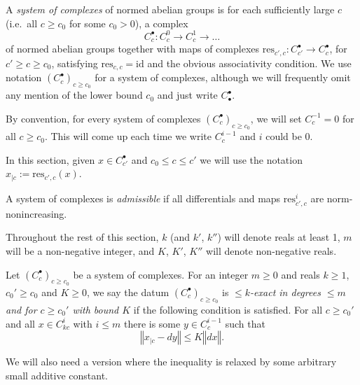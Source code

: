 \begin{definition}
  \label{system_of_complexes}
  \leanok
  A \emph{system of complexes} of normed abelian groups
  is for each sufficiently large $c$ (i.e.~all $c\geq c_0$ for some $c_0>0$),
  a complex
  \[
  C_c^\bullet: C_c^0\to C_c^1\to\ldots
  \]
  of normed abelian groups together with maps of complexes
  $\mathrm{res}_{c',c}: C_{c'}^\bullet\to C_c^\bullet$,
  for $c' ≥ c \geq c_0$,
  satisfying $\mathrm{res}_{c,c}=\mathrm{id}$ and the obvious associativity condition.
  We use notation $(C_c^\bullet)_{c\geq c_0}$ for a system of complexes,
  although we will frequently omit any mention of the lower bound $c_0$
  and just write $C_\bullet^\bullet$.
\end{definition}

By convention, for every system of complexes $(C_c^\bullet)_{c\geq c_0}$,
we will set $C^{-1}_c = 0$ for all $c\geq c_0$.
This will come up each time we write $C^{i-1}_c$ and $i$ could be $0$.

In this section, given $x ∈ C^•_{c'}$ and $c_0\leq c ≤ c'$ we will use the notation
$x_{|c} := \mathrm{res}_{c', c}(x)$.

\begin{definition}
  \label{admissible}
  \leanok
  A system of complexes is \emph{admissible}
  if all differentials and maps $\mathrm{res}_{c',c}^i$ are norm-nonincreasing.
\end{definition}

Throughout the rest of this section, $k$ (and $k'$, $k''$) will denote reals at least 1,
$m$ will be a non-negative integer, and $K$, $K'$, $K''$ will denote non-negative reals.

\begin{definition}
  \label{is_bounded_exact}
  \leanok
  Let $(C_c^\bullet)_{c\geq c_0}$ be a system of complexes.
  For an integer $m\geq 0$ and reals $k \ge 1$, $c_0'\geq c_0$ and $K\geq0$,
  we say the datum $(C_c^\bullet)_{c\geq c_0}$ is
  \emph{$\leq k$-exact in degrees $\leq m$ and for $c\geq c_0'$ with bound $K$} if the following condition is satisfied.
  For all $c\geq c_0'$ and all $x\in C_{kc}^i$ with $i\leq m$
  there is some $y\in C_c^{i-1}$ such that
  \[
    ‖x_{|c} - dy‖ ≤ K ‖dx‖.
  \]
\end{definition}

We will also need a version where the inequality is relaxed by some arbitrary small additive constant.

